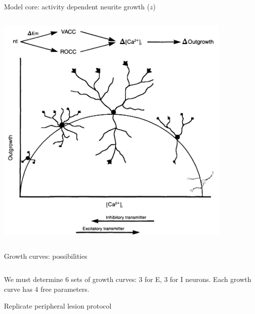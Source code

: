 \begin{frame}[t]{Model core: activity dependent neurite growth (\(z\))}
  \vspace{0.4cm}
  \begin{columns}
    \begin{column}{0.5\textwidth}
      \centering
      \includegraphics[width=0.9\textwidth]{99_images/lipton1989.png}%
    \end{column}
    \pause{}
    \begin{column}{0.5\textwidth}
      \centering
      
    \end{column}
  \end{columns}
\end{frame}
\begin{frame}[t]{Growth curves: possibilities}
  \vspace{0.4cm}
  \begin{columns}
    \begin{column}{0.5\textwidth}
      \centering
      
    \end{column}
    \begin{column}{0.5\textwidth}
      \centering
      
    \end{column}
  \end{columns}
  \begin{center}
    We must determine 6 sets of growth curves: 3 for E, 3 for I neurons. Each growth curve has 4 free parameters.
  \end{center}
\end{frame}
\begin{frame}[c]{Replicate peripheral lesion protocol}
  \begin{figure}[h]
    \centering
    
  \end{figure}
\end{frame}
